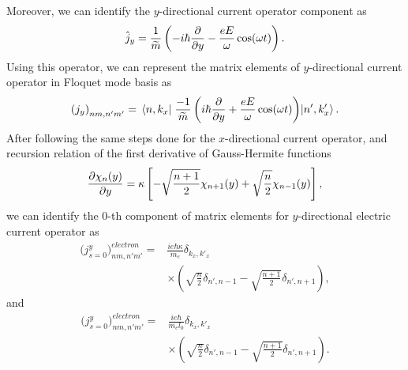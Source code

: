 \documentclass[
 reprint,
 amsmath,amssymb,
 aps,
 prb,
]{revtex4-2}
\begin{document}
{Moreover, we can identify the $y$-directional current operator component as
\begin{equation} \label{eq:d13}
  \hat{j}_y = \frac{1}{\widetilde{m}} \left(-i\hbar\pdv{y} - \frac{eE}{\omega}\cos(\omega t) \right).
\end{equation}
Using this operator, we can represent the matrix elements of $y$-directional current operator in Floquet mode basis as
\begin{equation} \label{eq:d14}
  \left({j}_y \right)_{nm,n'm'} =
  \mel{n,k_x}{\;\frac{-1}{\widetilde{m}} \left(i\hbar\pdv{y} + \frac{eE}{\omega}\cos(\omega t) \right)}{n',k'_x}.
\end{equation}
After following the same steps done for the $x$-directional current operator, and recursion relation of the first derivative of Gauss-Hermite functions \cite{boyd18}
\begin{equation} \label{eq:d15}
  \begin{aligned}
    \pdv{\chi_{n}({y})}{y} =
    \kappa\left[
    -  \sqrt{\frac{n+1}{2}} \chi_{n+1}({y})
    +  \sqrt{\frac{n}{2}} \chi_{n - 1}({y})
    \right],
  \end{aligned}
\end{equation}
we can identify the $0$-th component of matrix elements for $y$-directional electric current operator as
\begin{equation} \label{eq:d16}
  \begin{aligned}
    \Big({j}^y_{s=0}\Big)_{nm,n'm'}^{electron} = &
    \frac{ie\hbar\kappa}{{m_e}}
    \delta_{k_x,k'_x} \\
    & \times
    \left(
    \sqrt{\frac{n}{2}} \delta_{n',n-1}
    - \sqrt{\frac{n+1}{2}} \delta_{n',n+1}
    \right),
  \end{aligned}
\end{equation}
and
\begin{equation} \label{eq:d17}
  \begin{aligned}
    \Big({j}^y_{s=0}\Big)_{nm,n'm'}^{electron} = &
    \frac{ie\hbar}{{m_e}l_0}
    \delta_{k_x,k'_x} \\
    & \times
    \left(
    \sqrt{\frac{n}{2}} \delta_{n',n-1}
    - \sqrt{\frac{n+1}{2}} \delta_{n',n+1}
    \right).
  \end{aligned}
\end{equation}
}

\end{document}
